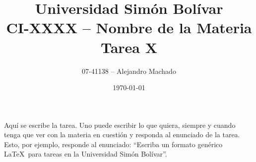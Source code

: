 \documentclass[letterpaper,12pt]{article}
\begin{document}
\title{\normalsize{Universidad Simón Bolívar\\ CI-XXXX -- Nombre de la Materia\\ Tarea X\\}}
\author{\normalsize{07-41138 -- Alejandro Machado}}
\date{\normalsize{\today}}
\maketitle

\thispagestyle{empty}
\pagestyle{empty}

Aquí se escribe la tarea. Uno puede escribir lo que quiera, siempre y cuando
tenga que ver con la materia en cuestión y responda al enunciado de la tarea.
Esto, por ejemplo, responde al enunciado: ``Escriba un formato genérico \LaTeX\
para tareas en la Universidad Simón Bolívar''.
\end{document}
